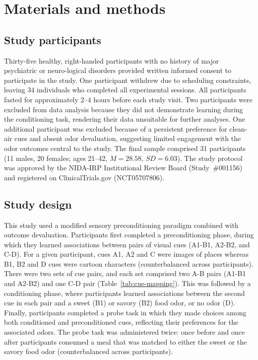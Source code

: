 \documentclass[12pt,letterpaper]{article}
\begin{document}
\section*{Materials and methods}


\subsection*{Study participants}

Thirty-five healthy, right-handed participants with no history of major psychiatric or neuro-logical disorders provided written informed consent to participate in the study. One participant withdrew due to scheduling constraints, leaving 34 individuals who completed all experimental sessions. All participants fasted for approximately 2–4 hours before each study visit. Two participants were excluded from data analysis because they did not demonstrate learning during the conditioning task, rendering their data unsuitable for further analyses. One additional participant was excluded because of a persistent preference for clean-air cues and absent odor devaluation, suggesting limited engagement with the odor outcomes central to the study. The final sample comprised 31 participants (11 males, 20 females; ages 21–42, $M = 28.58$, $SD = 6.03$). The study protocol was approved by the NIDA-IRP Institutional Review Board (Study~\#001156) and registered on ClinicalTrials.gov (NCT05707806).



\subsection*{Study design}


This study used a modified sensory preconditioning paradigm combined with outcome devaluation. Participants first completed a preconditioning phase, during which they learned associations between pairs of visual cues (A1-B1, A2-B2, and C-D). For a given participant, cues A1, A2 and C were images of places whereas B1, B2 and D cues were cartoon characters (counterbalanced across participants). There were two sets of cue pairs, and each set comprised two A-B pairs (A1-B1 and A2-B2) and one C-D pair (Table~\ref{tab:cue-mapping}). This was followed by a conditioning phase, where participants learned associations between the second cue in each pair and a sweet (B1) or savory (B2) food odor, or no odor (D). Finally, participants completed a probe task in which they made choices among both conditioned and preconditioned cues, reflecting their preferences for the associated odors. The probe task was administered twice: once before and once after participants consumed a meal that was matched to either the sweet or the savory food odor (counterbalanced across participants).
\end{document}
